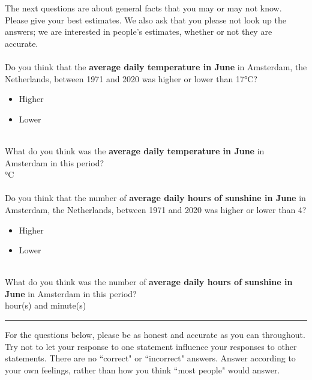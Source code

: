 \documentclass[pdftex,12pt, a4paper]{article}
\begin{document}
\noindent The next questions are about general facts that you may or may not know.
Please give your best estimates.
We also ask that you please not look up the answers; we are interested in people's estimates, whether or not they are accurate.\\
\\
Do you think that the \textbf{average daily temperature in June} in Amsterdam, the Netherlands, between 1971 and 2020 was higher or lower than 17°C?
\begin{itemize}
\item Higher
\item Lower
\end{itemize}
\leavevmode \\
\noindent What do you think was the \textbf{average daily temperature in June} in Amsterdam in this period?\\
\framebox[0.1\textwidth]{\rule{0pt}{15pt}}°C\\
\\
\noindent Do you think that the number of \textbf{average daily hours of sunshine in June} in Amsterdam, the Netherlands, between 1971 and 2020 was higher or lower than 4?
\begin{itemize}
\item Higher
\item Lower
\end{itemize}
\leavevmode \\
\noindent What do you think was the number of \textbf{average daily hours of sunshine in June} in Amsterdam in this period?\\
\framebox[0.1\textwidth]{\rule{0pt}{15pt}} hour(s) and \framebox[0.1\textwidth]{\rule{0pt}{15pt}} minute(s)

\bigskip
\noindent \rule{\linewidth}{0.4pt}

\noindent For the questions below, please be as honest and accurate as you can throughout.
Try not to let your response to one statement influence your responses to other statements.
There are no ``correct" or ``incorrect" answers.
Answer according to your own feelings, rather than how you think ``most people" would answer.
\end{document}
